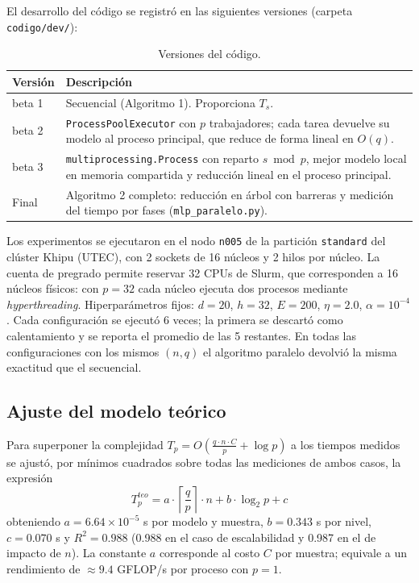 \documentclass[11pt, a4paper]{article}
\begin{document}
El desarrollo del código se registró en las siguientes versiones (carpeta \texttt{codigo/dev/}):

\begin{table}[H]
\centering
\begin{tabular}{p{2.6cm}p{11cm}}
\toprule
\textbf{Versión} & \textbf{Descripción} \\
\midrule
beta 1 & Secuencial (Algoritmo 1). Proporciona $T_s$. \\
beta 2 & \texttt{ProcessPoolExecutor} con $p$ trabajadores; cada tarea devuelve su modelo al proceso principal, que reduce de forma lineal en $O(q)$. \\
beta 3 & \texttt{multiprocessing.Process} con reparto $s \bmod p$, mejor modelo local en memoria compartida y reducción lineal en el proceso principal. \\
Final & Algoritmo 2 completo: reducción en árbol con barreras y medición del tiempo por fases (\texttt{mlp\_paralelo.py}). \\
\bottomrule
\end{tabular}
\caption{Versiones del código.}
\end{table}

Los experimentos se ejecutaron en el nodo \texttt{n005} de la partición \texttt{standard} del clúster Khipu (UTEC), con 2 sockets de 16 núcleos y 2 hilos por núcleo. La cuenta de pregrado permite reservar 32 CPUs de Slurm, que corresponden a 16 núcleos físicos: con $p = 32$ cada núcleo ejecuta dos procesos mediante \textit{hyperthreading}. Hiperparámetros fijos: $d = 20$, $h = 32$, $E = 200$, $\eta = 2.0$, $\alpha = 10^{-4}$. Cada configuración se ejecutó 6 veces; la primera se descartó como calentamiento y se reporta el promedio de las 5 restantes. En todas las configuraciones con los mismos $(n, q)$ el algoritmo paralelo devolvió la misma exactitud que el secuencial.

\subsection{Ajuste del modelo teórico}

Para superponer la complejidad $T_p = O\left(\frac{q \cdot n \cdot C}{p} + \log p\right)$ a los tiempos medidos se ajustó, por mínimos cuadrados sobre todas las mediciones de ambos casos, la expresión
$$T_p^{teo} = a \cdot \left\lceil \frac{q}{p} \right\rceil \cdot n + b \cdot \log_2 p + c$$
obteniendo $a = 6.64 \times 10^{-5}$ s por modelo y muestra, $b = 0.343$ s por nivel, $c = 0.070$ s y $R^2 = 0.988$ (0.988 en el caso de escalabilidad y 0.987 en el de impacto de $n$). La constante $a$ corresponde al costo $C$ por muestra; equivale a un rendimiento de $\approx 9.4$ GFLOP/s por proceso con $p = 1$.
\end{document}
